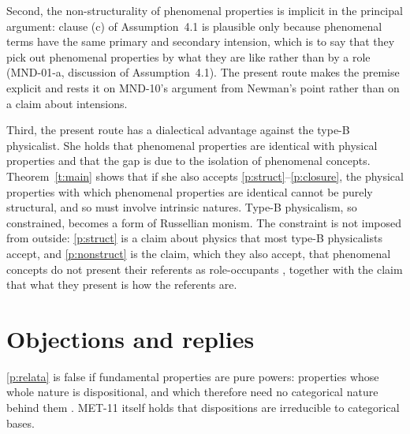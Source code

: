 \documentclass{situationist-preprint}
\begin{document}
Second, the non-structurality of phenomenal properties is implicit in the principal argument: clause (c) of Assumption~4.1 is plausible only because phenomenal terms have the same primary and secondary intension, which is to say that they pick out phenomenal properties by what they are like rather than by a role (MND-01-a, discussion of Assumption~4.1). The present route makes the premise explicit and rests it on MND-10's argument from Newman's point rather than on a claim about intensions.

Third, the present route has a dialectical advantage against the type-B physicalist. She holds that phenomenal properties are identical with physical properties and that the gap is due to the isolation of phenomenal concepts. Theorem~\ref{t:main} shows that if she also accepts \ref{p:struct}--\ref{p:closure}, the physical properties with which phenomenal properties are identical cannot be purely structural, and so must involve intrinsic natures. Type-B physicalism, so constrained, becomes a form of Russellian monism. The constraint is not imposed from outside: \ref{p:struct} is a claim about physics that most type-B physicalists accept, and \ref{p:nonstruct} is the claim, which they also accept, that phenomenal concepts do not present their referents as role-occupants \citep{Loar1990}, together with the claim that what they present is how the referents are.

\section{Objections and replies}\label{s:obj}

\begin{objection}\label{o:powers}
\ref{p:relata} is false if fundamental properties are pure powers: properties whose whole nature is dispositional, and which therefore need no categorical nature behind them \citep{Bird2007}. MET-11 itself holds that dispositions are irreducible to categorical bases.
\end{objection}
\end{document}
